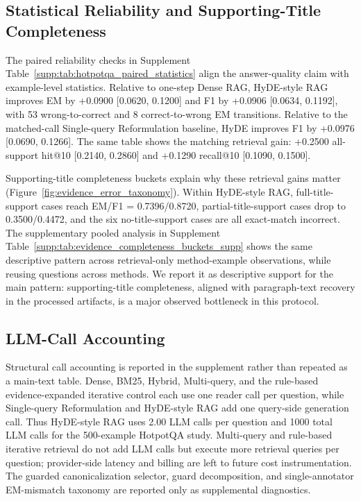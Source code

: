 \subsection{Statistical Reliability and Supporting-Title Completeness}
\label{sec:statistical_evidence_completeness}

The paired reliability checks in Supplement Table~\ref{supp:tab:hotpotqa_paired_statistics} align the answer-quality claim with example-level statistics. Relative to one-step Dense RAG, HyDE-style RAG improves EM by +0.0900 [0.0620, 0.1200] and F1 by +0.0906 [0.0634, 0.1192], with 53 wrong-to-correct and 8 correct-to-wrong EM transitions. Relative to the matched-call Single-query Reformulation baseline, HyDE improves F1 by +0.0976 [0.0690, 0.1266]. The same table shows the matching retrieval gain: +0.2500 all-support hit@10 [0.2140, 0.2860] and +0.1290 recall@10 [0.1090, 0.1500].

Supporting-title completeness buckets explain why these retrieval gains matter (Figure~\ref{fig:evidence_error_taxonomy}). Within HyDE-style RAG, full-title-support cases reach EM/F1 = 0.7396/0.8720, partial-title-support cases drop to 0.3500/0.4472, and the six no-title-support cases are all exact-match incorrect. The supplementary pooled analysis in Supplement Table~\ref{supp:tab:evidence_completeness_buckets_supp} shows the same descriptive pattern across retrieval-only method-example observations, while reusing questions across methods. We report it as descriptive support for the main pattern: supporting-title completeness, aligned with paragraph-text recovery in the processed artifacts, is a major observed bottleneck in this protocol.



\subsection{LLM-Call Accounting}
\label{sec:call_accounting_safety}

Structural call accounting is reported in the supplement rather than repeated as a main-text table. Dense, BM25, Hybrid, Multi-query, and the rule-based evidence-expanded iterative control each use one reader call per question, while Single-query Reformulation and HyDE-style RAG add one query-side generation call. Thus HyDE-style RAG uses 2.00 LLM calls per question and 1000 total LLM calls for the 500-example HotpotQA study. Multi-query and rule-based iterative retrieval do not add LLM calls but execute more retrieval queries per question; provider-side latency and billing are left to future cost instrumentation. The guarded canonicalization selector, guard decomposition, and single-annotator EM-mismatch taxonomy are reported only as supplemental diagnostics.

